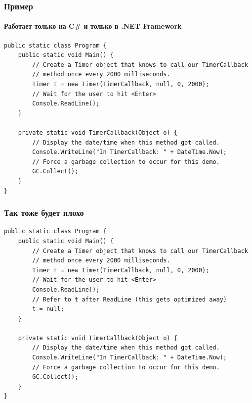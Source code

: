 \documentclass{../../slides-style}
\begin{document}
    \begin{frame}[fragile]
        \frametitle{Пример}
        \framesubtitle{Работает только на C\# и только в .NET Framework}
        \begin{footnotesize}
            \begin{verbatim}
public static class Program {
    public static void Main() {
        // Create a Timer object that knows to call our TimerCallback
        // method once every 2000 milliseconds.
        Timer t = new Timer(TimerCallback, null, 0, 2000);
        // Wait for the user to hit <Enter>
        Console.ReadLine();
    }

    private static void TimerCallback(Object o) {
        // Display the date/time when this method got called.
        Console.WriteLine("In TimerCallback: " + DateTime.Now);
        // Force a garbage collection to occur for this demo.
        GC.Collect();
    }
}
            \end{verbatim}
        \end{footnotesize}
    \end{frame}

    \begin{frame}[fragile]
        \frametitle{Так тоже будет плохо}
        \begin{footnotesize}
            \begin{verbatim}
public static class Program {
    public static void Main() {
        // Create a Timer object that knows to call our TimerCallback
        // method once every 2000 milliseconds.
        Timer t = new Timer(TimerCallback, null, 0, 2000);
        // Wait for the user to hit <Enter>
        Console.ReadLine();
        // Refer to t after ReadLine (this gets optimized away)
        t = null;
    }

    private static void TimerCallback(Object o) {
        // Display the date/time when this method got called.
        Console.WriteLine("In TimerCallback: " + DateTime.Now);
        // Force a garbage collection to occur for this demo.
        GC.Collect();
    }
}
            \end{verbatim}
        \end{footnotesize}
    \end{frame}
\end{document}
